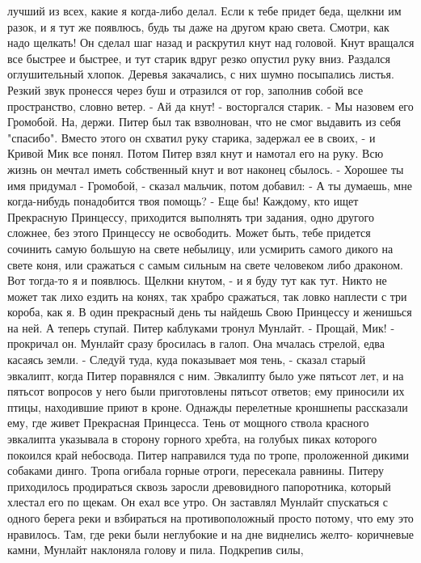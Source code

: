 лучший из всех, какие я когда-либо делал. Если к тебе придет беда, 
щелкни им разок, и я тут же появлюсь, будь ты даже на другом краю 
света. Смотри, как надо щелкать!
    Он сделал шаг назад и раскрутил кнут над головой. Кнут вращался 
все быстрее и быстрее, и тут старик вдруг резко опустил руку вниз. 
Раздался оглушительный хлопок. Деревья закачались, с них шумно 
посыпались листья. Резкий звук пронесся через буш и отразился от гор, 
заполнив собой все пространство, словно ветер.
    - Ай да кнут! - восторгался старик. - Мы назовем его Громобой. На, 
держи.
    Питер был так взволнован, что не смог выдавить из себя "спасибо". 
Вместо этого он схватил руку старика, задержал ее в своих, - и Кривой 
Мик все понял. Потом Питер взял кнут и намотал его на руку. Всю жизнь 
он мечтал иметь собственный кнут и вот наконец сбылось.
    - Хорошее ты имя придумал - Громобой, - сказал мальчик, потом 
добавил: - А ты думаешь, мне когда-нибудь понадобится твоя помощь?
    - Еще бы! Каждому, кто ищет Прекрасную Принцессу, приходится 
выполнять три задания, одно другого сложнее, без этого Принцессу не 
освободить. Может быть, тебе придется сочинить самую большую на свете 
небылицу, или усмирить самого дикого на свете коня, или сражаться с 
самым сильным на свете человеком либо драконом. Вот тогда-то я и 
появлюсь. Щелкни кнутом, - и я буду тут как тут. Никто не может так 
лихо ездить на конях, так храбро сражаться, так ловко наплести с три 
короба, как я. В один прекрасный день ты найдешь Свою Принцессу и 
женишься на ней. А теперь ступай.
    Питер каблуками тронул Мунлайт.
    - Прощай, Мик! - прокричал он.
    Мунлайт сразу бросилась в галоп. Она мчалась стрелой, едва касаясь 
земли.
    - Следуй туда, куда показывает моя тень, - сказал старый эвкалипт, 
когда Питер поравнялся с ним. Эвкалипту было уже пятьсот лет, и на 
пятьсот вопросов у него были приготовлены пятьсот ответов; ему 
приносили их птицы, находившие приют в кроне. Однажды перелетные 
кроншнепы рассказали ему, где живет Прекрасная Принцесса.
    Тень от мощного ствола красного эвкалипта указывала в сторону 
горного хребта, на голубых пиках которого покоился край небосвода. 
Питер направился туда по тропе, проложенной дикими собаками динго. 
Тропа огибала горные отроги, пересекала равнины. Питеру приходилось 
продираться сквозь заросли древовидного папоротника, который хлестал 
его по щекам.
    Он ехал все утро. Он заставлял Мунлайт спускаться с одного берега 
реки и взбираться на противоположный просто потому, что ему это 
нравилось. Там, где реки были неглубокие и на дне виднелись желто-
коричневые камни, Мунлайт наклоняла голову и пила. Подкрепив силы, 
